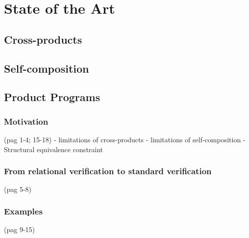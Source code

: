 
%

\makeatletter
\newcommand{\ntifpkgloaded}{%
  \@ifpackageloaded%
}
\makeatother


\chapter{State of the Art}
\label{cha:state_of_the_art}



\section{Cross-products} 
\label{sec:cross_products}




\section{Self-composition} 
\label{sec:self_composition}




\section{Product Programs} 
\label{sec:product_programs}

\subsection{Motivation} 
\label{sec:product_programs_motivation}

(pag 1-4; 15-18)
- limitations of cross-products
- limitations of self-composition
- Structural equivalence constraint


\subsection{From relational verification to standard verification} 
\label{sec:product_programs_relationalverif_to_standardverif}

(pag 5-8)


\subsection{Examples} 
\label{sec:product_programs_examples}

(pag 9-15)

